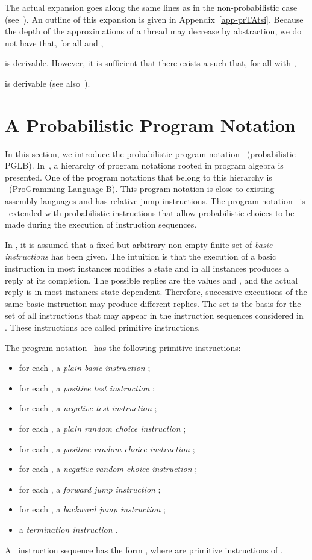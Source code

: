 \documentclass{llncs}
\begin{document}
The actual expansion goes along the same lines as in the 
non-probabilistic case (see~\cite{BM12b}).
An outline of this expansion is given in Appendix~\ref{app-prTAtsi}.
Because the depth of the approximations of a thread may decrease by 
abstraction, we do not have that, for all  and ,

is derivable.
However, it is sufficient that there exists a  such that, 
for all  with , 
 
is derivable (see also~\cite{BM12b}).

\section{A Probabilistic Program Notation}
\label{sect-prPGLB}

In this section, we introduce the probabilistic program notation 
\prPGLB\ (probabilistic PGLB).
In~\cite{BL02a}, a hierarchy of program notations rooted in program
algebra is presented.
One of the program notations that belong to this hierarchy is \PGLB\
(ProGramming Language B).
This program notation is close to existing assembly languages and has
relative jump instructions.
The program notation \prPGLB\ is \PGLB\ extended with probabilistic 
instructions that allow probabilistic choices to be made during the 
execution of instruction sequences. 

In \prPGLB, it is assumed that a fixed but arbitrary non-empty finite
set  of \emph{basic instructions} has been given.
The intuition is that the execution of a basic instruction in most
instances modifies a state and in all instances produces a reply at its
completion.
The possible replies are the values  and , and the actual 
reply is in most instances state-dependent.
Therefore, successive executions of the same basic instruction may
produce different replies.
The set  is the basis for the set of all instructions that may
appear in the instruction sequences considered in \prPGLB.
These instructions are called primitive instructions.

The program notation \prPGLB\ has the following primitive instructions:
\begin{itemize}
\item
for each , a \emph{plain basic instruction} ;
\item
for each , a \emph{positive test instruction} ;
\item
for each , a \emph{negative test instruction} ;
\item
for each , a \emph{plain random choice instruction} 
;
\item
for each , a \emph{positive random choice instruction} 
;
\item
for each , a \emph{negative random choice instruction} 
;
\item
for each , a \emph{forward jump instruction}
;
\item
for each , a \emph{backward jump instruction}
;
\item
a \emph{termination instruction} .
\end{itemize}
A \prPGLB\ instruction sequence has the form
, where  are primitive
instructions of \prPGLB.
\end{document}
